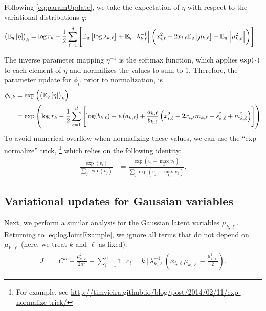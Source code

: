 \documentclass[11pt]{article}
\newcommand*{\placeholder}{\makebox[1ex]{$\cdot$}}
\begin{document}
Following \eqref{eq:paramUpdate}, we take the expectation of $\eta$ with respect to the variational distributions $q$:
\begin{align}
\left( \mathbb{E}_{\substack{q}}\left[ \eta \right] \right)_k
&=
\log r_k - \frac{1}{2} \sum_{\ell=1}^d \left[ \mathbb{E}_{\substack{q}}\left[ \log \lambda_{k,\ell} \right] + \mathbb{E}_{\substack{q}}\left[ \lambda_{k,\ell}^{-1} \right] \left( x_{i,\ell}^2 - 2 x_{i,\ell} \mathbb{E}_{\substack{q}}\left[ \mu_{k,\ell} \right] + \mathbb{E}_{\substack{q}}\left[ \mu_{k,\ell}^2 \right] \right) \right]
\end{align}

The inverse parameter mapping $\eta^{-1}$ is the softmax function, which applies $\exp(\placeholder)$ to each element of $\eta$ and normalizes the values to sum to $1$.
Therefore, the parameter update for $\phi_i$, prior to normalization, is
\begin{align}
\phi_{i,k}
&= \exp\left( \left( \mathbb{E}_{\substack{q}}\left[ \eta \right] \right)_k \right) \\
\label{eq:exVarUpdatePhi}
&=
\exp \left(
\log r_k - \frac{1}{2} \sum_{\ell=1}^d
    \left[
        \log(b_{k,\ell}) - \psi(a_{k,\ell}) + \frac{a_{k,\ell}}{b_{k,\ell}}
        \left(
            x_{i,\ell}^2 - 2 x_{i,\ell} m_{k,\ell} + s_{k,\ell}^2 + m_{k,\ell}^2
        \right)
    \right]
\right)
\end{align}
To avoid numerical overflow when normalizing these values, we can use the ``exp-normalize'' trick,%
\footnote{For example, see \url{http://timvieira.github.io/blog/post/2014/02/11/exp-normalize-trick/}}
which relies on the following identity:
\begin{align}
\frac{\exp(v_i)}{\sum_j \exp(v_j)}
&= \frac{\exp(v_i - \max_k v_k)}{\sum_j \exp(v_j - \max_k v_k)}.
\end{align}

\subsection{Variational updates for Gaussian variables}

Next, we perform a similar analysis for the Gaussian latent variables $\mu_{k,\ell}$.
Returning to \eqref{eq:logJointExample}, we ignore all terms that do not depend on $\mu_{k,\ell}$ (here, we treat $k$ and $\ell$ as fixed):
\begin{align}
J
&=
    C'' - \frac{\mu_{k, \ell}^2}{2\alpha^2}
    + \sum_{i=1}^n \mathds{1}[c_i = k] \lambda_{k,\ell}^{-1} \left( x_{i,\ell} \mu_{k,\ell} - \frac{\mu_{k,\ell}^2}{2} \right)
    .
\end{align}
\end{document}

